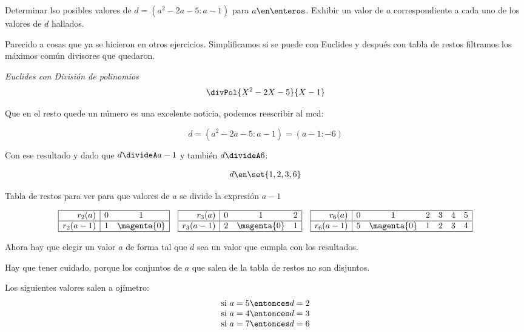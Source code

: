 \begin{enunciado}{\ejExtra}
	Determinar lso posibles valores de $d = (a^2 - 2a -5: a-1)$ para $a \en \enteros$. Exhibir un valor de $a$
	correspondiente a cada uno de los valores de $d$ hallados.
\end{enunciado}


Parecido a cosas que ya se hicieron en otros ejercicios. Simplificamos si se puede con Euclides y después con tabla de restos
filtramos los máximos común divisores que quedaron.\par \bigskip

\textit{Euclides con División de polinomios}
$$
	\divPol{X^2 - 2X -5}{X-1}
$$

Que en el resto quede un número es una excelente noticia, podemos reescribir al mcd:

$$
	d = (a^2 - 2a -5: a-1) = (a-1 : -6)
$$

Con ese resultado y dado que $d  \divideA a - 1$ y también $d\divideA 6$:

$$
	d \en \set{1, 2, 3, 6}
$$

Tabla de restos para ver para que valores de $a$ se divide la expresión $a-1$

$$
	\begin{array}{|r|cc|}
		\hline
		r_2(a)     & 0 & 1           \\ \hline
		r_2(a - 1) & 1 & \magenta{0} \\ \hline
	\end{array}
	\quad
	\begin{array}{|r|ccc|}
		\hline
		r_3(a)     & 0 & 1           & 2 \\ \hline
		r_3(a - 1) & 2 & \magenta{0} & 1 \\ \hline
	\end{array}
	\quad
	\begin{array}{|r|cccccc|}
		\hline
		r_6(a)     & 0 & 1           & 2 & 3 & 4 & 5 \\ \hline
		r_6(a - 1) & 5 & \magenta{0} & 1 & 2 & 3 & 4 \\ \hline
	\end{array}
$$\par

Ahora hay que elegir un valor $a$ de forma tal que $d$ sea un valor que cumpla con los resultados.\par

Hay que tener cuidado, porque los conjuntos de $a$ que salen de la tabla de restos no son disjuntos.

Los siguientes valores salen a ojímetro:
$$
	\begin{array}{c}
		\text{si } a = 5 \entonces d = 2 \\
		\text{si } a = 4 \entonces d = 3 \\
		\text{si } a = 7 \entonces d = 6
	\end{array}
$$

\begin{aportes}
  \item {}
\end{aportes}
